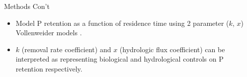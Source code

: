 \documentclass[final,hyperref={pdfpagelabels=false}]{beamer}
\begin{document}
\begin{frame}[t]
\begin{columns}[t]
\begin{column}{.03\textwidth}\end{column} %
 
\begin{column}{.465\textwidth} %

\begin{block}{Methods Con't}

\begin{itemize}
\item Model P retention as a function of residence time using 2 parameter ($k$, $x$) Vollenweider models \cite{Brettreviewreassessmentlake2007}. 
\vspace{1em}
\item $k$ (removal rate coefficient) and $x$ (hydrologic flux coefficient) can be interpreted as representing biological and hydrological controls on P retention respectively.

\end{itemize}


\end{block}

% 
% 
% 


\end{column}
\end{columns}
\end{frame}
\end{document}
